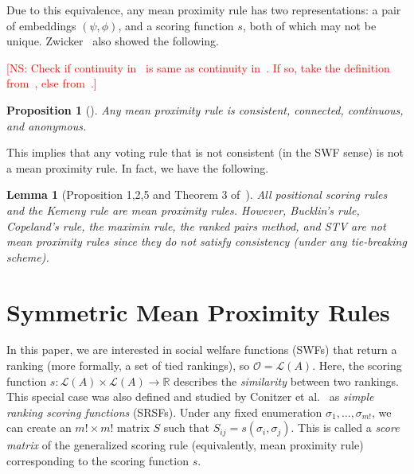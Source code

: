 \documentclass[10pt,letterpaper]{article}
\newcommand{\calL}{{\mathcal{L}}}
\newcommand{\rank}{{\calL(A)}}
\newcommand{\calO}{{\mathcal{O}}}
\newtheorem{lemma}{Lemma}
\newtheorem{proposition}{Proposition}
\newcommand{\kibitz}[2]{\ifnum\Comments=1\textcolor{#1}{#2}\fi}
\newcommand{\cns}[1]{\kibitz{red} {[NS: #1]}}
\begin{document}

Due to this equivalence, any mean proximity rule has two representations: a pair of embeddings $(\psi,\phi)$, and a scoring function $s$, both of which may not be unique. Zwicker~\cite{Zwicker08b} also showed the following. %

\cns{Check if continuity in~\cite{CRX09} is same as continuity in~\cite{Zwicker08a}. If so, take the definition from~\cite{Zwicker08a}, else from~\cite{CRX09}.}
\begin{proposition}[\cite{Zwicker08b}]
Any mean proximity rule is consistent, connected, continuous, and anonymous.
\label{prop:properties}
\end{proposition}

This implies that any voting rule that is not consistent (in the SWF sense) is not a mean proximity rule. In fact, we have the following.

\begin{lemma}[Proposition 1,2,5 and Theorem 3 of~\cite{CRX09}]
All positional scoring rules and the Kemeny rule are mean proximity rules. However, Bucklin's rule, Copeland's rule, the maximin rule, the ranked pairs method, and STV are not mean proximity rules since they do not satisfy consistency (under any tie-breaking scheme). 
\end{lemma}


\section{Symmetric Mean Proximity Rules}

In this paper, we are interested in social welfare functions (SWFs) that return a ranking (more formally, a set of tied rankings), so $\calO = \rank$. %
Here, the scoring function $s : \rank \times \rank \rightarrow \mathbb{R}$ describes the \emph{similarity} between two rankings. This special case was also defined and studied by Conitzer et al.~\cite{CRX09} as \emph{simple ranking scoring functions} (SRSFs). Under any fixed enumeration $\sigma_1,\ldots,\sigma_{m!}$, we can create an $m! \times m!$ matrix $S$ such that $S_{ij} = s(\sigma_i,\sigma_j)$. This is called a \emph{score matrix} of the generalized scoring rule (equivalently, mean proximity rule) corresponding to the scoring function $s$. 
\end{document}
